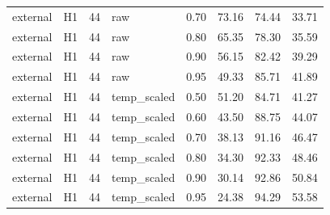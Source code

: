 \begin{tabular}{llrlrrrr}
external & H1 & 44 & raw & 0.70 & 73.16 & 74.44 & 33.71 \\
external & H1 & 44 & raw & 0.80 & 65.35 & 78.30 & 35.59 \\
external & H1 & 44 & raw & 0.90 & 56.15 & 82.42 & 39.29 \\
external & H1 & 44 & raw & 0.95 & 49.33 & 85.71 & 41.89 \\
external & H1 & 44 & temp\_scaled & 0.50 & 51.20 & 84.71 & 41.27 \\
external & H1 & 44 & temp\_scaled & 0.60 & 43.50 & 88.75 & 44.07 \\
external & H1 & 44 & temp\_scaled & 0.70 & 38.13 & 91.16 & 46.47 \\
external & H1 & 44 & temp\_scaled & 0.80 & 34.30 & 92.33 & 48.46 \\
external & H1 & 44 & temp\_scaled & 0.90 & 30.14 & 92.86 & 50.84 \\
external & H1 & 44 & temp\_scaled & 0.95 & 24.38 & 94.29 & 53.58 \\
\bottomrule
\end{tabular}
